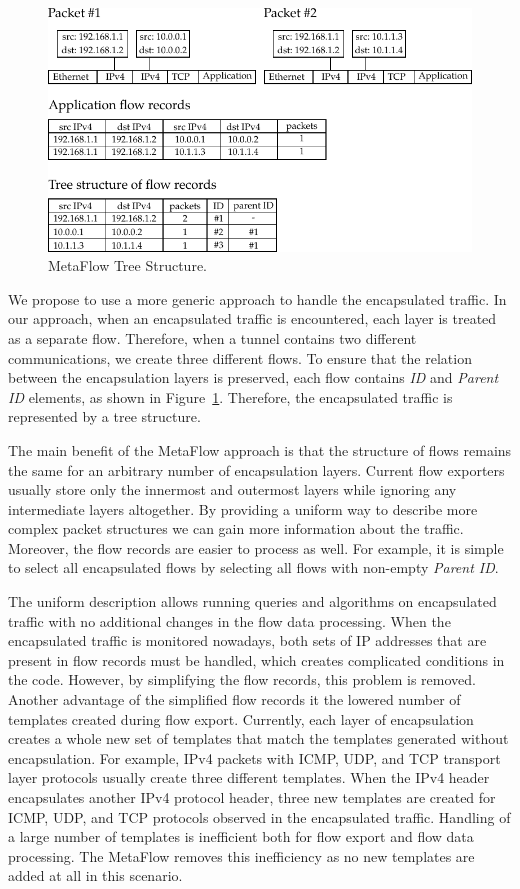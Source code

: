 \begin{figure}[!tb]
    \centering 
    \includegraphics{figures/c07/metaflow}
    \caption{MetaFlow Tree Structure.}
    \label{fig:metaflow}
\end{figure}

We propose to use a more generic approach to handle the encapsulated traffic. In our approach, when an encapsulated traffic is encountered, each layer is treated as a separate flow. Therefore, when a tunnel contains two different communications, we create three different flows. To ensure that the relation between the encapsulation layers is preserved, each flow contains \emph{ID} and \emph{Parent ID} elements, as shown in Figure~\ref{fig:metaflow}. Therefore, the encapsulated traffic is represented by a tree structure.

The main benefit of the MetaFlow approach is that the structure of flows remains the same for an arbitrary number of encapsulation layers. Current flow exporters usually store only the innermost and outermost layers while ignoring any intermediate layers altogether. By providing a uniform way to describe more complex packet structures we can gain more information about the traffic. Moreover, the flow records are easier to process as well. For example, it is simple to select all encapsulated flows by selecting all flows with non-empty \emph{Parent ID}.

The uniform description allows running queries and algorithms on encapsulated traffic with no additional changes in the flow data processing. When the encapsulated traffic is monitored nowadays, both sets of IP addresses that are present in flow records must be handled, which creates complicated conditions in the code. However, by simplifying the flow records, this problem is removed. Another advantage of the simplified flow records it the lowered number of templates created during flow export. Currently, each layer of encapsulation creates a whole new set of templates that match the templates generated without encapsulation. For example, IPv4 packets with ICMP, UDP, and TCP transport layer protocols usually create three different templates. When the IPv4 header encapsulates another IPv4 protocol header, three new templates are created for ICMP, UDP, and TCP protocols observed in the encapsulated traffic. Handling of a large number of templates is inefficient both for flow export and flow data processing. The MetaFlow removes this inefficiency as no new templates are added at all in this scenario.

